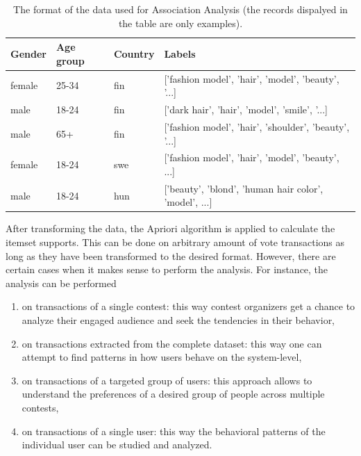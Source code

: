     \begin{table}[H]
        \centering
        \begin{adjustbox}{width=0.8\textwidth}
            \begin{tabular}{l|l|l|l}
                \textbf{Gender} & \textbf{Age group} & \textbf{Country} & \textbf{Labels} \\
                \hline
                female & 25-34 & fin & ['fashion model', 'hair', 'model', 'beauty', '...] \\
                male & 18-24 & fin & ['dark hair', 'hair', 'model', 'smile', '...] \\
                male & 65+ & fin & ['fashion model', 'hair', 'shoulder', 'beauty', '...] \\
                female & 18-24 & swe & ['fashion model', 'hair', 'model', 'beauty', ...] \\
                male & 18-24 & hun & ['beauty', 'blond', 'human hair color', 'model', ...]
            \end{tabular}
        \end{adjustbox}
        \caption{The format of the data used for Association Analysis (the records dispalyed in the table are only examples).}
        \label{association_analyisis_data}
    \end{table}

    After transforming the data, the Apriori algorithm is applied to calculate the itemset supports. This can be done on arbitrary amount of vote transactions as long as they have been transformed to the desired format. However, there are certain cases when it makes sense to perform the analysis. For instance, the analysis can be performed 

    \begin{enumerate}
        \item on transactions of a single contest: this way contest organizers get a chance to analyze their engaged audience and seek the tendencies in their behavior,
        \item on transactions extracted from the complete dataset: this way one can attempt to find patterns in how users behave on the system-level,
        \item on transactions of a targeted group of users: this approach allows to understand the preferences of a desired group of people across multiple contests,
        \item on transactions of a single user: this way the behavioral patterns of the individual user can be studied and analyzed. 
    \end{enumerate}

